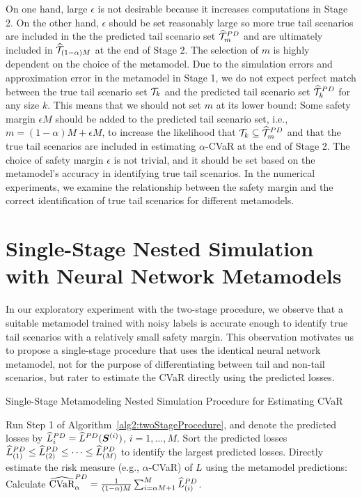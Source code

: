 On one hand, large $\epsilon$ is not desirable because it increases computations in Stage 2.
On the other hand, $\epsilon$ should be set reasonably large so more true tail scenarios are included in the the predicted tail scenario set $\widehat{\mathcal{T}}_{m}^{PD}$ and are ultimately included in $\widehat{\mathcal{T}}_{(1-\alpha )M}$ at the end of Stage 2.
The selection of $m$ is highly dependent on the choice of the metamodel.
Due to the simulation errors and approximation error in the metamodel in Stage 1, we do not expect perfect match between the true tail scenario set $\mathcal{T}_{k}$ and the predicted tail scenario set $\widehat{\mathcal{T}}_{k}^{PD}$ for any size $k$.
This means that we should not set $m$ at its lower bound: Some safety margin $\epsilon M$ should be added to the predicted tail scenario set, i.e., $m = (1-\alpha )M + \epsilon M$, to increase the likelihood that $\mathcal{T}_{k} \subseteq \widehat{\mathcal{T}}_{m}^{PD}$ and that the true tail scenarios are included in estimating $\alpha$-CVaR at the end of Stage 2.
The choice of safety margin $\epsilon$ is not trivial, and it should be set based on the metamodel's accuracy in identifying true tail scenarios.
In the numerical experiments, we examine the relationship between the safety margin and the correct identification of true tail scenarios for different metamodels.

\section{Single-Stage Nested Simulation with Neural Network Metamodels} \label{sec2:metamodel1Stage}

In our exploratory experiment with the two-stage procedure, we observe that a suitable metamodel trained with noisy labels is accurate enough to identify true tail scenarios with a relatively small safety margin.
This observation motivates us to propose a single-stage procedure that uses the identical neural network metamodel, not for the purpose of differentiating between tail and non-tail scenarios, but rater to estimate the CVaR directly using the predicted losses. 

\begin{algorithm}
\caption{Single-Stage Metamodeling Nested Simulation Procedure for Estimating CVaR}
\begin{algorithmic}[1] \label{alg2:oneStageProcedure}
    \STATE Run Step 1 of Algorithm~\ref{alg2:twoStageProcedure}, and denote the predicted losses by
    $\widehat{L}^{PD}_i = \widehat{L}^{PD}(\bm{S}^{(i)})$, $i=1,\ldots,M$.
    \STATE Sort the predicted losses $\widehat{L}^{PD}_{(1)}\leq \widehat{L}^{PD}_{(2)} \leq \cdots\leq \widehat{L}^{PD}_{(M)}$ to identify the largest predicted losses. 
    \STATE Directly estimate the risk measure (e.g., $\alpha$-CVaR) of $L$ using the metamodel predictions: Calculate $\widehat{\mbox{CVaR}}^{PD}_\alpha = \frac{1}{(1-\alpha)M} \sum_{i=\alpha M + 1}^{M}\widehat{L}^{PD}_{(i)}$.
\end{algorithmic}
\end{algorithm}

